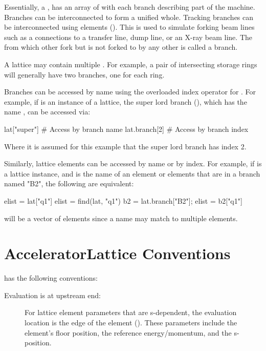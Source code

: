 Essentially, a , has an array  of  with each branch 
describing part of the machine. 
Branches can be interconnected to form a unified whole.
Tracking branches can be interconnected using  elements (). 
This is used to simulate forking beam lines such as a connections to a transfer line, dump line, or an
X-ray beam line. The  from which other  fork but is not forked to by any
other  is called a  branch.

A lattice may contain multiple  . For example, a pair of intersecting storage
rings will generally have two  branches, one for each ring.

Branches can be accessed by name using the overloaded index operator for . 
For example, if  is an instance of a lattice, the super lord branch (),
which has the name , can be accessed via:
\begin{example}
  lat["super"]     # Access by branch name
  lat.branch[2]    # Access by branch index
\end{example}
Where it is assumed for this example that the super lord branch has index 2.

Similarly, lattice elements can be accessed by name or by index.
For example, if  is a lattice instance, and  is the name of an element or
elements that are in a branch named "B2", the following are equivalent:
\begin{example}
  elist = lat["q1"]
  elist = find(lat, "q1")
  b2 = lat.branch["B2"]; elist = b2["q1"]
\end{example}
 will be a vector of elements since a name may match to multiple elements.

\section{AcceleratorLattice Conventions}
\label{s:conventions}

\accellat has the following conventions:
\begin{description}
%
\item[Evaluation is at upstream end:] 
For lattice element parameters that are s-dependent, the evaluation location is the
 edge of the element (). These parameters include the 
element's floor position, the reference energy/momentum, and the s-position.
%
\end{description}


